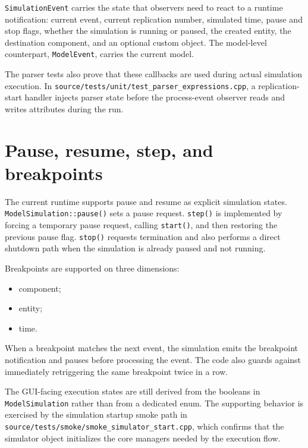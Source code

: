 \texttt{SimulationEvent} carries the state that observers need to react to a
runtime notification: current event, current replication number, simulated
time, pause and stop flags, whether the simulation is running or paused, the
created entity, the destination component, and an optional custom object. The
model-level counterpart, \texttt{ModelEvent}, carries the current model.

The parser tests also prove that these callbacks are used during actual
simulation execution. In
\texttt{source/tests/unit/test\_parser\_expressions.cpp}, a replication-start
handler injects parser state before the process-event observer reads and writes
attributes during the run.

\section{Pause, resume, step, and breakpoints}
\label{sec:event-scheduling-pause-breakpoints}

The current runtime supports pause and resume as explicit simulation states.
\texttt{ModelSimulation::pause()} sets a pause request. \texttt{step()} is
implemented by forcing a temporary pause request, calling \texttt{start()}, and
then restoring the previous pause flag. \texttt{stop()} requests termination and
also performs a direct shutdown path when the simulation is already paused and
not running.

Breakpoints are supported on three dimensions:
\begin{itemize}
\item component;
\item entity;
\item time.
\end{itemize}

When a breakpoint matches the next event, the simulation emits the breakpoint
notification and pauses before processing the event. The code also guards
against immediately retriggering the same breakpoint twice in a row.

The GUI-facing execution states are still derived from the booleans in
\texttt{ModelSimulation} rather than from a dedicated enum. The supporting
behavior is exercised by the simulation startup smoke path in
\texttt{source/tests/smoke/smoke\_simulator\_start.cpp}, which confirms that the
simulator object initializes the core managers needed by the execution flow.

